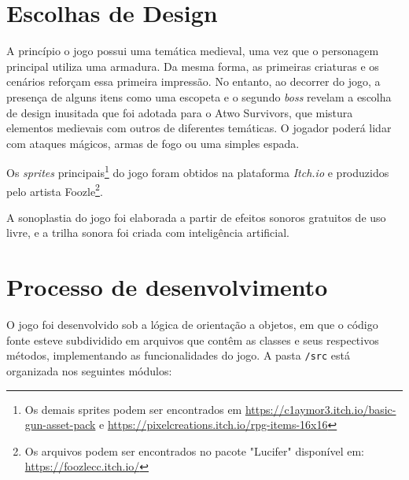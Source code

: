 \documentclass[a4paper,12pt]{article}
\begin{document}
\section{Escolhas de Design}

A princípio o jogo possui uma temática medieval, uma vez que o personagem principal utiliza uma armadura. Da mesma forma, as primeiras criaturas e os cenários reforçam essa primeira impressão. No entanto, ao decorrer do jogo, a presença de alguns itens como uma escopeta e o segundo \textit{boss} revelam a escolha de design inusitada que foi adotada para o Atwo Survivors, que mistura elementos medievais com outros de diferentes temáticas. O jogador poderá lidar com ataques mágicos, armas de fogo ou uma simples espada.

Os \textit{sprites} principais\footnote{Os demais sprites podem ser encontrados em \href{https://c1aymor3.itch.io/basic-gun-asset-pack}{https://c1aymor3.itch.io/basic-gun-asset-pack} e \href{https://pixelcreations.itch.io/rpg-items-16x16}{https://pixelcreations.itch.io/rpg-items-16x16}} do jogo foram obtidos na plataforma \textit{Itch.io} e produzidos pelo artista Foozle\footnote{Os arquivos podem ser encontrados no pacote "Lucifer" \space disponível em: \href{https://foozlecc.itch.io/}{https://foozlecc.itch.io/}}. 

A sonoplastia do jogo foi elaborada a partir de efeitos sonoros gratuitos de uso livre, e a trilha sonora foi criada com inteligência artificial. 


\section{Processo de desenvolvimento}

O jogo foi desenvolvido sob a lógica de orientação a objetos, em que o código fonte esteve subdividido em arquivos que contêm as classes e seus respectivos métodos, implementando as funcionalidades do jogo. A pasta \texttt{/src} está organizada nos seguintes módulos:
\end{document}
